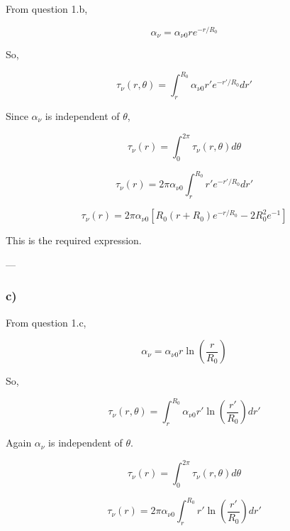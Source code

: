 \documentclass{article}
\begin{document}
From question 1.b,

\begin{equation}
\alpha_\nu=\alpha_{\nu 0} r e^{-r/R_0}
\end{equation}

So,

\begin{equation}
\tau_\nu(r,\theta)=\int_r^{R_0}\alpha_{\nu 0} r' e^{-r'/R_0}dr'
\end{equation}

Since $\alpha_\nu$ is independent of $\theta$,

\begin{equation}
\tau_\nu(r)=\int_0^{2\pi}\tau_\nu(r,\theta)d\theta
\end{equation}

\begin{equation}
\tau_\nu(r)=2\pi\alpha_{\nu 0}\int_r^{R_0} r' e^{-r'/R_0}dr'
\end{equation}

\begin{equation}
\boxed{
\tau_\nu(r)
=
2\pi\alpha_{\nu0}
\left[
R_0(r+R_0)e^{-r/R_0}
-
2R_0^2e^{-1}
\right]
}
\end{equation}

This is the required expression.

---

\subsubsection{c)}

From question 1.c,

\begin{equation}
\alpha_\nu=\alpha_{\nu 0} r\ln\left(\frac{r}{R_0}\right)
\end{equation}

So,

\begin{equation}
\tau_\nu(r,\theta)=\int_r^{R_0}\alpha_{\nu 0} r'\ln\left(\frac{r'}{R_0}\right)dr'
\end{equation}

Again $\alpha_\nu$ is independent of $\theta$.

\begin{equation}
\tau_\nu(r)=\int_0^{2\pi}\tau_\nu(r,\theta)d\theta
\end{equation}

\begin{equation}
\boxed{
\tau_\nu(r)=2\pi\alpha_{\nu 0}\int_r^{R_0} r'\ln\left(\frac{r'}{R_0}\right)dr'
}
\end{equation}
\end{document}
